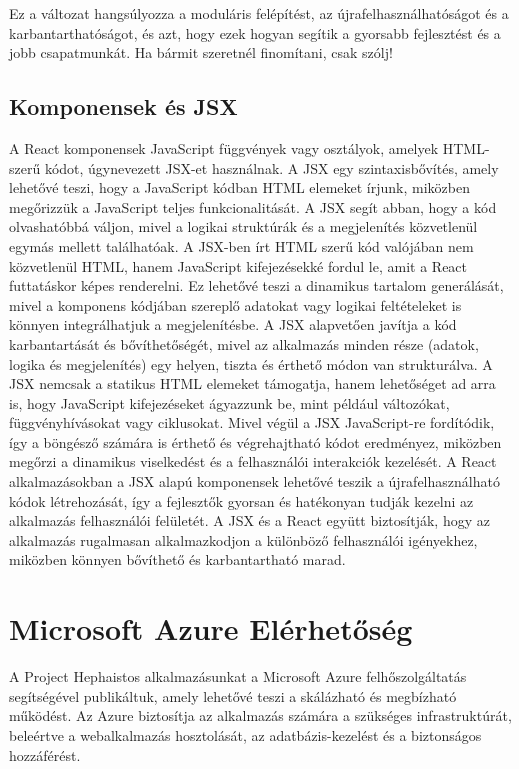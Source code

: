 \documentclass[colorlinks]{thesis-kando}
\theoremstyle{definition}
\theoremstyle{remark}
\begin{document}
Ez a változat hangsúlyozza a moduláris felépítést, az újrafelhasználhatóságot és a karbantarthatóságot, és azt, hogy ezek hogyan segítik a gyorsabb fejlesztést és a jobb csapatmunkát. Ha bármit szeretnél finomítani, csak szólj!

\subsection{Komponensek és JSX}
A React komponensek JavaScript függvények vagy osztályok, amelyek HTML-szerű kódot, úgynevezett JSX-et használnak. A JSX egy szintaxisbővítés, amely lehetővé teszi, hogy a JavaScript kódban HTML elemeket írjunk, miközben megőrizzük a JavaScript teljes funkcionalitását. A JSX segít abban, hogy a kód olvashatóbbá váljon, mivel a logikai struktúrák és a megjelenítés közvetlenül egymás mellett találhatóak. A JSX-ben írt HTML szerű kód valójában nem közvetlenül HTML, hanem JavaScript kifejezésekké fordul le, amit a React futtatáskor képes renderelni. Ez lehetővé teszi a dinamikus tartalom generálását, mivel a komponens kódjában szereplő adatokat vagy logikai feltételeket is könnyen integrálhatjuk a megjelenítésbe. A JSX alapvetően javítja a kód karbantartását és bővíthetőségét, mivel az alkalmazás minden része (adatok, logika és megjelenítés) egy helyen, tiszta és érthető módon van strukturálva. A JSX nemcsak a statikus HTML elemeket támogatja, hanem lehetőséget ad arra is, hogy JavaScript kifejezéseket ágyazzunk be, mint például változókat, függvényhívásokat vagy ciklusokat. Mivel végül a JSX JavaScript-re fordítódik, így a böngésző számára is érthető és végrehajtható kódot eredményez, miközben megőrzi a dinamikus viselkedést és a felhasználói interakciók kezelését. A React alkalmazásokban a JSX alapú komponensek lehetővé teszik a újrafelhasználható kódok létrehozását, így a fejlesztők gyorsan és hatékonyan tudják kezelni az alkalmazás felhasználói felületét. A JSX és a React együtt biztosítják, hogy az alkalmazás rugalmasan alkalmazkodjon a különböző felhasználói igényekhez, miközben könnyen bővíthető és karbantartható marad.

\section*{Microsoft Azure Elérhetőség}
A Project Hephaistos alkalmazásunkat a Microsoft Azure felhőszolgáltatás segítségével publikáltuk, amely lehetővé teszi a skálázható és megbízható működést. Az Azure biztosítja az alkalmazás számára a szükséges infrastruktúrát, beleértve a webalkalmazás hosztolását, az adatbázis-kezelést és a biztonságos hozzáférést.
\end{document}
